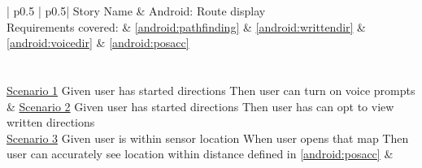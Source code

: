 \begin{longtable}{| p{} | p{}|}
	\hline
	\newline Story Name & \newline Android: Route display\\\hline
	\newline Requirements covered: & \ref{android:pathfinding} \& \ref{android:writtendir} \& \ref{android:voicedir} \& \ref{android:posacc}\\\hline
	\\\hline
	\\\hline
	\newline\underline{Scenario 1}\newline
	Given user has started directions \newline 
	Then user can turn on voice prompts\newline
	&
	\newline\underline{Scenario 2}\newline
	Given user has started directions \newline 
	Then user has can opt to view written directions \newline
	\\\hline
	\newline\underline{Scenario 3}\newline
	Given user is within sensor location \newline 
	When user opens that map \newline
	Then user can accurately see location within distance defined in \ref{android:posacc} \newline
	&
	\\\hline
\end{longtable}